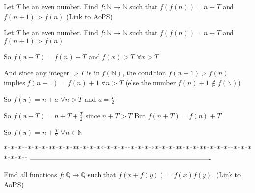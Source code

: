 \begin{problem}
	Let $T$ be an even number. Find $f:\mathbb{N} \to \mathbb{N}$ such that $f(f(n))=n+T$ and $f(n+1)>f(n)$
	\flushright \href{https://artofproblemsolving.com/community/c6h483106}{(Link to AoPS)}
\end{problem}



\begin{solution}
	\begin{tcolorbox}Let $T$ be an even number. Find $f:\mathbb{N} \to \mathbb{N}$ such that $f(f(n))=n+T$ and $f(n+1)>f(n)$\end{tcolorbox}
So $f(n+T)=f(n)+T$ and $f(x)>T$ $\forall x>T$

And since any integer $>T$ is in $f(\mathbb N)$, the condition $f(n+1)>f(n)$ implies $f(n+1)=f(n)+1$ $\forall n>T$ (else the number $f(n)+1\not\in f(\mathbb N)$)

So $f(n)=n+a$ $\forall n>T$ and $a=\frac T2$

So $f(n+T)=n+T+\frac T2$ since $n+T>T$ 
But $f(n+T)=f(n)+T$

So $\boxed{f(n)=n+\frac T2}$ $\forall n\in\mathbb N$
\end{solution}
*******************************************************************************
-------------------------------------------------------------------------------

\begin{problem}
	Find all functions $f:\mathbb{Q}\to \mathbb{Q}$ such that $f(x+f(y))=f(x)f(y)$.
	\flushright \href{https://artofproblemsolving.com/community/c6h483238}{(Link to AoPS)}
\end{problem}



